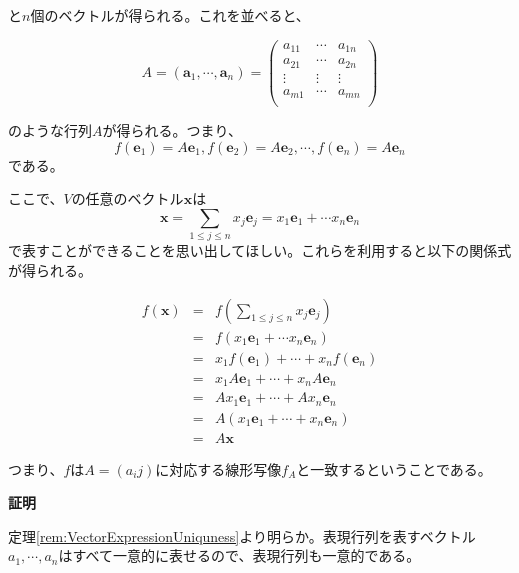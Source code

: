 \documentclass[dvipdfmx,autodetect-engine]{jsarticle}
\begin{document}
と$n$個のベクトルが得られる。これを並べると、

$$
A = (\bm{a}_1, \cdots, \bm{a}_n) = 
\begin{pmatrix}
a_{11} & \cdots & a_{1n} \\
a_{21} & \cdots & a_{2n} \\
\vdots & \vdots & \vdots \\
a_{m1} & \cdots & a_{mn} \\
\end{pmatrix}
$$

のような行列$A$が得られる。つまり、
$$
f(\bm{e}_1) = A\bm{e}_1, f(\bm{e}_2) = A\bm{e}_2, \cdots, f(\bm{e}_n) = A\bm{e}_n
$$
である。

ここで、$V$の任意のベクトル$\bm{x}$は
$$
\bm{x} = \sum_{1 \leq j \leq n} x_{j}\bm{e}_j = x_1\bm{e}_1 + \cdots x_n\bm{e}_n
$$で表すことができることを思い出してほしい。これらを利用すると以下の関係式が得られる。

\begin{eqnarray*}
f(\bm{x}) &= &f(\sum_{1 \leq j \leq n} x_{j}\bm{e}_j)  \\
&= &f(x_1\bm{e}_1 + \cdots x_n\bm{e}_n) \\
&= &x_1f(\bm{e}_1) + \cdots + x_nf(\bm{e}_n) \\
&= &x_1A\bm{e}_1 + \cdots + x_nA\bm{e}_n \\
&= &Ax_1\bm{e}_1 + \cdots + Ax_n\bm{e}_n \\
&= &A(x_1\bm{e}_1 + \cdots + x_n\bm{e}_n) \\
&= &A\bm{x}
\end{eqnarray*}

つまり、$f$は$A = (a_ij)$に対応する線形写像$f_A$と一致するということである。



{\bf 証明}

定理\ref{rem:VectorExpressionUniquness}より明らか。表現行列を表すベクトル$a_1, \cdots, a_n$はすべて一意的に表せるので、表現行列も一意的である。
\end{document}
